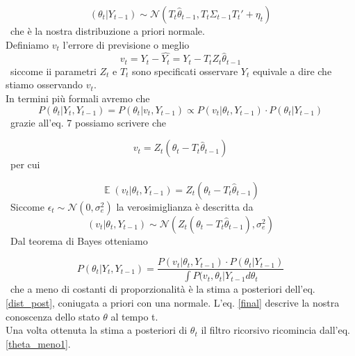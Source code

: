 \documentclass[]{article}
\DeclareMathOperator{\E}{\mathbb{E}}
\begin{document}
\begin{equation}
	(\theta_t|Y_{t-1}) \sim \mathcal{N}(T_t \hat{\theta}_{t-1}, T_t  \Sigma_{t-1} T_t' + \eta_t)
\end{equation}
\
che è la nostra distribuzione a priori normale.
\\
Definiamo $v_t $ l'errore di previsione o meglio
\begin{equation}
	v_t = Y_t - \hat{Y_t} = Y_t - T_t Z_t \hat{\theta}_{t-1}
\end{equation}
\
siccome ii parametri $Z_t$ e $T_t$ sono specificati osservare $Y_t$ equivale a dire che stiamo osservando $v_t$.
\\
In termini più formali avremo che 
\begin{equation}
	P(\theta_t|Y_t,Y_{t-1}) = P(\theta_t|v_t,Y_{t-1}) \propto P(v_t| \theta_t,Y_{t-1}) \cdot P(\theta_t|Y_{t-1})
\end{equation}
\
grazie all'eq. 7 possiamo scrivere che

\begin{equation}
	v_t = Z_t(\theta_t - T_t \hat{\theta}_{t-1}) 
\end{equation}
\
per cui 

\begin{equation}
	\E(v_t|\theta_t,Y_{t-1}) = Z_t(\theta_t - T_t \hat{\theta}_{t-1}) 
\end{equation}
\
Siccome  $\epsilon_t \sim \mathcal{N}(0,\sigma^2_e)$ la verosimiglianza è descritta da
\begin{equation}
	(v_t | \theta_t,Y_{t-1}) \sim \mathcal{N}( Z_t(\theta_t - T_t \hat{\theta}_{t-1}) , \sigma^2_e)
\end{equation}
\
Dal teorema di Bayes otteniamo 

\begin{equation}
	P(\theta_t|Y_t,Y_{t-1}) = \frac{P(v_t|\theta_t,Y_{t-1})\cdot P(\theta_t| Y_{t-1})}{\int P(v_t,\theta_t| Y_{t-1} d\theta_t}
	\label{final}
\end{equation}
\
che a meno di costanti di proporzionalità è la stima a posteriori dell'eq. \ref{dist_post}, coniugata a priori con una normale. 
L'eq. \ref{final} descrive la nostra conoscenza dello stato $\theta$ al tempo t.
\\
Una volta ottenuta la stima a posteriori di $\theta_t$ il filtro ricorsivo ricomincia dall'eq. \ref{theta_meno1}.
\end{document}
